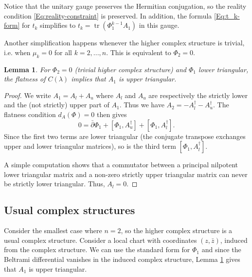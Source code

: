 \documentclass[11pt]{amsart}
\newtheorem{lemma}[thm]{Lemma}
\numberwithin{thm}{section} %
\numberwithin{equation}{section} %
\numberwithin{figure}{section} %
\renewcommand*{\l}{\lambda}
\DeclareMathOperator{\tr}{tr}
\begin{document}
Notice that the unitary gauge preserves the Hermitian conjugation, so the reality condition \eqref{Eq:reality-constraint} is preserved. In addition, the formula \eqref{Eq:t_k-form} for $t_k$ simplifies to $t_k=\tr(\Phi_1^{k-1}A_1)$ in this gauge.

Another simplification happens whenever the higher complex structure is trivial, i.e. when $\mu_k=0$ for all $k=2,...,n$. This is equivalent to $\Phi_2=0$. 

\begin{lemma}\label{a1upper}
For $\Phi_2=0$ (trivial higher complex structure) and $\Phi_1$ lower triangular, the flatness of $C(\l)$ implies that $A_1$ is upper triangular.
\end{lemma}
\begin{proof}
We write $A_1=A_l + A_u$ where $A_l$ and $A_u$ are respectively the strictly lower and the (not strictly) upper part of $A_1$. Thus we have $A_2 = -A_l^{\dagger}-A_u^{\dagger}$.
The flatness condition $d_A(\Phi)=0$ then gives $$0=\bar{\partial}\Phi_1 + [\Phi_1,A_u^{\dagger}]+[\Phi_1,A_l^{\dagger}].$$
Since the first two terms are lower triangular (the conjugate transpose exchanges upper and lower triangular matrices), so is the third term $[\Phi_1,A_l^{\dagger}]$.

A simple computation shows that a commutator between a principal nilpotent lower triangular matrix and a non-zero strictly upper triangular matrix can never be strictly lower triangular. Thus, $A_l=0$.
\end{proof}


\subsection{Usual complex structures}\label{Sec:n2}

Consider the smallest case where $n=2$, so the higher complex structure is a usual complex structure. Consider a local chart with coordinates $(z,\bar{z})$, induced from the complex structure. We can use the standard form for $\Phi_1$ and since the Beltrami differential vanishes in the induced complex structure, Lemma \ref{a1upper} gives that $A_1$ is upper triangular.
\end{document}
